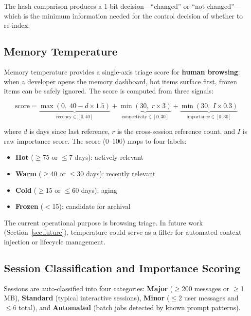 \documentclass[11pt]{article}
\begin{document}
The hash comparison produces a 1-bit decision---``changed'' or ``not changed''---which is the minimum information needed for the control decision of whether to re-index.

\subsection{Memory Temperature}

Memory temperature provides a single-axis triage score for \textbf{human browsing}: when a developer opens the memory dashboard, hot items surface first, frozen items can be safely ignored. The score is computed from three signals:

\begin{equation}
\text{score} = \underbrace{\max(0,\; 40 - d \times 1.5)}_{\text{recency} \in [0,40]} + \underbrace{\min(30,\; r \times 3)}_{\text{connectivity} \in [0,30]} + \underbrace{\min(30,\; I \times 0.3)}_{\text{importance} \in [0,30]}
\label{eq:temperature}
\end{equation}

\noindent where $d$ is days since last reference, $r$ is the cross-session reference count, and $I$ is raw importance score. The score (0--100) maps to four labels:

\begin{itemize}[nosep]
  \item \textbf{Hot} ($\geq$75 or $\leq$7 days): actively relevant
  \item \textbf{Warm} ($\geq$40 or $\leq$30 days): recently relevant
  \item \textbf{Cold} ($\geq$15 or $\leq$60 days): aging
  \item \textbf{Frozen} ($<$15): candidate for archival
\end{itemize}

The current operational purpose is browsing triage. In future work (Section~\ref{sec:future}), temperature could serve as a filter for automated context injection or lifecycle management.

\subsection{Session Classification and Importance Scoring}

Sessions are auto-classified into four categories: \textbf{Major} ($\geq$200 messages or $\geq$1\,MB), \textbf{Standard} (typical interactive sessions), \textbf{Minor} ($\leq$2 user messages and $\leq$6 total), and \textbf{Automated} (batch jobs detected by known prompt patterns).
\end{document}
